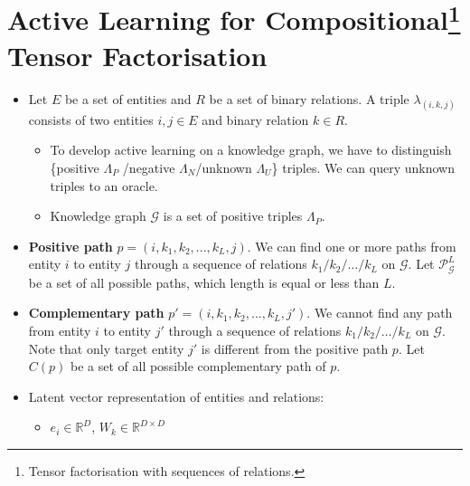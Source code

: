 \documentclass{article}
\theoremstyle{definition}
\begin{document}
 
\section[ctf]{Active Learning for Compositional\footnote{Tensor factorisation with sequences of relations\cite{gu2015traversing}.} Tensor Factorisation}

\begin{itemize}
\item Let $E$ be a set of entities and $R$ be a set of binary relations. A triple $\lambda_{(i, k, j)}$ consists of two entities $i,j\in E$ and binary relation $k \in R$.
\begin{itemize}
\item To develop active learning on a knowledge graph, we have to distinguish \{positive $\Lambda_P$ /negative $\Lambda_N$/unknown $\Lambda_U$\} triples. We can query unknown triples to an oracle.
\item Knowledge graph $\mathcal{G}$ is a set of positive triples $\Lambda_P$. 
\end{itemize}

\item \textbf{Positive path} $p = (i, {k_1}, {k_2}, ... , {k_L}, j)$. We can find one or more paths from entity $i$ to entity $j$ through a sequence of relations $k_1 / k_2 / \dots / k_L$ on $\mathcal{G}$. Let $\mathcal{P}_\mathcal{G}^L$ be a set of all possible paths, which length is equal or less than $L$.

\item \textbf{Complementary path} $p' = (i, {k_1}, {k_2}, ... , {k_L}, {j'})$. We cannot find any path from entity $i$ to entity $j'$ through a sequence of relations $k_1 / k_2 / \dots / k_L$ on  $\mathcal{G}$. Note that only target entity $j'$ is different from the positive path $p$. Let $C(p)$ be a set of all possible complementary path of $p$.

\item Latent vector representation of entities and relations:
\begin{itemize}
\item $e_i \in \mathbb{R}^{D}$, $W_k \in \mathbb{R}^{D\times D}$
\end{itemize}


\end{itemize}
\end{document}
